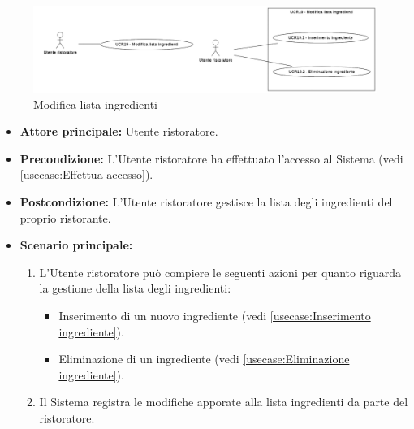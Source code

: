 \label{usecase:Modifica lista ingredienti}

\begin{figure}[h]
	\centering
	\includegraphics[width=0.9999\textwidth]{./uml/UCR19.png} 
	\caption{Modifica lista ingredienti}
	\label{fig:UCR19}
  \end{figure}

\begin{itemize}
	\item \textbf{Attore principale:} Utente ristoratore.

	\item \textbf{Precondizione:} L'Utente ristoratore ha effettuato l'accesso al Sistema (vedi \autoref{usecase:Effettua accesso}).

	\item \textbf{Postcondizione:} L'Utente ristoratore gestisce la lista degli ingredienti del proprio ristorante.


	\item \textbf{Scenario principale:}
	      \begin{enumerate}

		      \item L'Utente ristoratore può compiere le seguenti azioni per quanto riguarda la gestione della lista degli ingredienti:
		      \begin{itemize}
                \item Inserimento di un nuovo ingrediente (vedi \autoref{usecase:Inserimento ingrediente}).
                \item Eliminazione di un ingrediente (vedi \autoref{usecase:Eliminazione ingrediente}).
              \end{itemize}
		      \item Il Sistema registra le modifiche apporate alla lista ingredienti da parte del ristoratore.

	      \end{enumerate}
\end{itemize}

